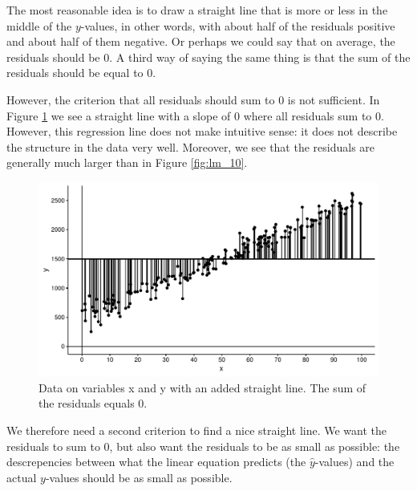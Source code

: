 \documentclass[]{book}\usepackage[]{graphicx}\usepackage[]{color}
\makeatletter
\def\maxwidth{ %
  \ifdim\Gin@nat@width>\linewidth
    \linewidth
  \else
    \Gin@nat@width
  \fi
}
\newenvironment{knitrout}{}{} %
\makeatother
\begin{document}
The most reasonable idea is to draw a straight line that is more or less in the middle of the $y$-values, in other words, with about half of the residuals positive and about half of them negative. Or perhaps we could say that on average, the residuals should be 0. A third way of saying the same thing is that the sum of the residuals should be equal to 0.

However, the criterion that all residuals should sum to 0 is not sufficient. In Figure \ref{fig:lm_12} we see a straight line with a slope of 0 where all residuals sum to 0. However, this regression line does not make intuitive sense: it does not describe the structure in the data very well. Moreover, we see that the residuals are generally much larger than in Figure \ref{fig:lm_10}.

\begin{knitrout}
\color{fgcolor}\begin{figure}

{\centering \includegraphics[width=\maxwidth]{figure/lm_12-1} 

}

\caption[Data on variables x and y with an added straight line]{Data on variables x and y with an added straight line. The sum of the residuals equals 0.}\label{fig:lm_12}
\end{figure}


\end{knitrout}

We therefore need a second criterion to find a nice straight line. We want the residuals to sum to 0, but also want the residuals to be as small as possible: the descrepencies between what the linear equation predicts (the $\hat{y}$-values) and the actual $y$-values should be as small as possible.
\end{document}
